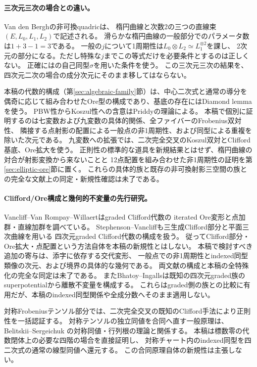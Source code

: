 \documentclass[11pt,a4paper]{ltjsarticle}
\theoremstyle{definition}
\begin{document}
\paragraph{三次元三次の場合との違い。}
Van den Bergh\cite[Theorem 5.5.10, \S5.6]{VdB}の非可換quadricは、
楕円曲線と次数2の三つの直線束$(E,L_0,L_1,L_2)$で記述される。
滑らかな楕円曲線の一般部分でのパラメータ数は$1+3-1=3$である。
一般の$j$について1周期性は$L_0\otimes L_2\simeq L_1^{\otimes2}$を課し、
2次元の部分になる。ただし特殊な$j$までこの等式だけを必要条件とするのは正しくない。
正確には\cite[\S5.6]{VdB}の自己同型$\sigma$を用いた条件を使う。
この三次元三次の結果を、四次元二次の場合の成分次元にそのまま移してはならない。

本稿の代数的構成（第\ref{sec:algebraic-family}節）は、中心二次式と通常の導分を
偶奇に応じて組み合わせたOre型の構成であり、基底の存在にはDiamond lemmaを使う。
PBW性からKoszul性への含意はPriddyの理論\cite{Priddy}による。
本稿で個別に証明するのは七変数および九変数の具体的関係、全ファイバーのFrobenius双対性、
隣接する点射影の配置による一般点の非1周期性、および同型による重複を除いた次元である。
九変数への拡張では、二次完全交叉のKoszul双対とClifford基底、Ore拡大を使う。
正則性の標準的な道具を新規結果とはせず、楕円曲線の対合が射影変換から来ないことと
12点配置を組み合わせた非1周期性の証明を第\ref{sec:elliptic-ore}節に置く。
これらの具体的族と既存の非可換射影三空間の族との完全な文献上の同定・新規性確認は未了である。

\paragraph{Clifford/Ore構成と幾何的不変量の先行研究。}
Vancliff--Van Rompay--Willaert\cite[\S3]{VVRW}はgraded Clifford代数の
iterated Ore変形と点加群・直線加群を調べている。
Stephenson--Vancliff\cite{SV}も三生成Clifford部分と平面三次曲線を用いる
四次元graded Clifford代数の構成を扱う。
従ってClifford部分・Ore拡大・点配置という方法自体を本稿の新規性とはしない。
本稿で検討すべき追加の寄与は、添字に依存する交代変形、
一般点での非1周期性とindexed同型類像の次元、および境界の具体的な幾何である。
両文献の構成と本稿の全特殊化の完全な同定は未了である。
またBhatoy--Ingalls\cite{BI}は既知の四次元graded族のsuperpotentialから離散不変量を構成する。
これらはgraded側の族との比較に有用だが、本稿のindexed同型関係や全成分数へそのまま適用しない。

対称Frobeniusテンソル部分では、二次完全交叉の既知のClifford手法により正則性を一括認証する。
対称テンソルの独立同値を合同へ直す一般原理は、Belitskii--Sergeichuk
\cite[Theorem 2(a), Lemma 4(a)]{BS2006}の対称同値・行列根の理論と関係する。
本稿は標数零の代数閉体上の必要な四階の場合を直接証明し、
対称チャート内のindexed同型を四二次式の通常の線型同値へ還元する。
この合同原理自体の新規性は主張しない。
\end{document}
